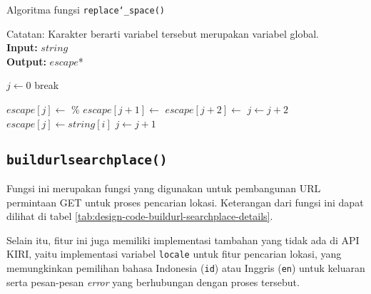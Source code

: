 \begin{algorithm}[h]
	\caption{Algoritma fungsi \texttt{replace\char`_space()}}
	\label{alg:design-replacespace}
	\vspace{-0.6\baselineskip}
	\begin{flushleft}
		Catatan: Karakter \textquotesingle *\textquotesingle\xspace berarti variabel tersebut merupakan variabel global.\\
        \textbf{Input:} $string$ \\
        \textbf{Output:} $escape$* \\
	\end{flushleft}
	\vspace{-1.05\baselineskip}
	\begin{algorithmic}
		\State $j \gets 0$
			 
			    \State break 
			\EndIf
		
			\If{$string[i]$ == \textquotesingle\xspace\textquotesingle}
			    \State $escape[j] \gets$ \textquotesingle\%\textquotesingle
			    \State $escape[j + 1] \gets$ \textquotesingle
			    \State $escape[j + 2] \gets$ \textquotesingle
			    \State $j \gets j + 2$ 
			\Else
				\State $escape[j] \gets string[i]$ 
			\EndIf
			\State $j \gets j + 1$
		\EndFor
	\end{algorithmic}
\end{algorithm}

\subsection{\texttt{build\textunderscore url\textunderscore searchplace()}}
\label{sec:design-code-buildurl-searchplace}

Fungsi ini merupakan fungsi yang digunakan untuk pembangunan URL permintaan	GET untuk proses pencarian lokasi. Keterangan dari fungsi ini dapat dilihat di tabel \ref{tab:design-code-buildurl-searchplace-details}.
	
	Selain itu, fitur ini juga memiliki implementasi tambahan yang tidak ada di API KIRI, yaitu implementasi variabel \verb|locale| untuk fitur pencarian lokasi, yang memungkinkan pemilihan bahasa Indonesia (\verb|id|) atau Inggris (\verb|en|) untuk keluaran serta pesan-pesan \textit{error} yang berhubungan dengan proses tersebut.

